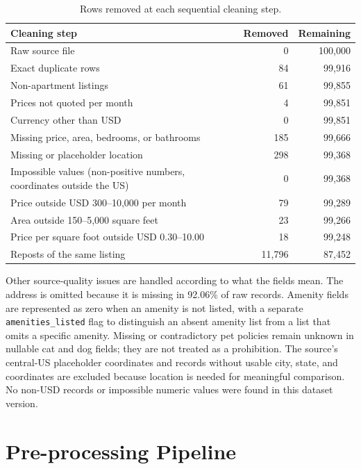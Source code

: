 \documentclass[12pt,a4paper]{report}
\begin{document}
\begin{table}[htbp]
\centering
\caption{Rows removed at each sequential cleaning step.}
\label{tab:cleaning-steps}
\small
\begin{tabularx}{\textwidth}{Xrr}
\toprule
\textbf{Cleaning step} & \textbf{Removed} & \textbf{Remaining} \\
\midrule
Raw source file & 0 & 100,000 \\
Exact duplicate rows & 84 & 99,916 \\
Non-apartment listings & 61 & 99,855 \\
Prices not quoted per month & 4 & 99,851 \\
Currency other than USD & 0 & 99,851 \\
Missing price, area, bedrooms, or bathrooms & 185 & 99,666 \\
Missing or placeholder location & 298 & 99,368 \\
Impossible values (non-positive numbers, coordinates outside the US) & 0 & 99,368 \\
Price outside USD 300--10,000 per month & 79 & 99,289 \\
Area outside 150--5,000 square feet & 23 & 99,266 \\
Price per square foot outside USD 0.30--10.00 & 18 & 99,248 \\
Reposts of the same listing & 11,796 & 87,452 \\
\bottomrule
\end{tabularx}
\end{table}

Other source-quality issues are handled according to what the fields mean.
The address is omitted because it is missing in 92.06\% of raw records.
Amenity fields are represented as zero when an amenity is not listed, with a
separate \texttt{amenities\_listed} flag to distinguish an absent amenity
list from a list that omits a specific amenity. Missing or contradictory pet
policies remain unknown in nullable cat and dog fields; they are not treated
as a prohibition. The source's central-US placeholder coordinates and records
without usable city, state, and coordinates are excluded because location is
needed for meaningful comparison. No non-USD records or impossible numeric
values were found in this dataset version.

\section{Pre-processing Pipeline}
\end{document}

